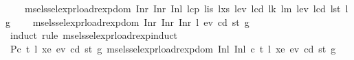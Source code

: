 \begin{isabellebody}
\ \ \ \ {\isachardoublequoteopen}msel{\isacharunderscore}{\kern0pt}ssel{\isacharunderscore}{\kern0pt}expr{\isacharunderscore}{\kern0pt}load{\isacharunderscore}{\kern0pt}rexp{\isacharunderscore}{\kern0pt}dom\ {\isacharparenleft}{\kern0pt}Inr\ {\isacharparenleft}{\kern0pt}Inr\ {\isacharparenleft}{\kern0pt}Inl\ {\isacharparenleft}{\kern0pt}lcp{\isacharcomma}{\kern0pt}\ lis{\isacharcomma}{\kern0pt}\ lxs{\isacharcomma}{\kern0pt}\ lev{}{\isacharcomma}{\kern0pt}\ lcd{}{\isacharcomma}{\kern0pt}\ lk{\isacharcomma}{\kern0pt}\ lm{\isacharcomma}{\kern0pt}\ lev{\isacharcomma}{\kern0pt}\ lcd{\isacharcomma}{\kern0pt}\ lst{\isacharcomma}{\kern0pt}\ lg{\isacharparenright}{\kern0pt}{\isacharparenright}{\kern0pt}{\isacharparenright}{\kern0pt}{\isacharparenright}{\kern0pt}{\isachardoublequoteclose}\isanewline
\ \ \ \ {\isachardoublequoteopen}msel{\isacharunderscore}{\kern0pt}ssel{\isacharunderscore}{\kern0pt}expr{\isacharunderscore}{\kern0pt}load{\isacharunderscore}{\kern0pt}rexp{\isacharunderscore}{\kern0pt}dom\ {\isacharparenleft}{\kern0pt}Inr\ {\isacharparenleft}{\kern0pt}Inr\ {\isacharparenleft}{\kern0pt}Inr\ {\isacharparenleft}{\kern0pt}l{}{\isacharcomma}{\kern0pt}\ ev{}{\isacharcomma}{\kern0pt}\ cd{}{\isacharcomma}{\kern0pt}\ st{}{\isacharcomma}{\kern0pt}\ g{}{\isacharparenright}{\kern0pt}{\isacharparenright}{\kern0pt}{\isacharparenright}{\kern0pt}{\isacharparenright}{\kern0pt}{\isachardoublequoteclose}\isanewline
%
\isadelimproof
%
\endisadelimproof
%
\isatagproof
{}\isamarkupfalse%
\ {\isacharparenleft}{\kern0pt}induct\ rule{\isacharcolon}{\kern0pt}\ msel{\isacharunderscore}{\kern0pt}ssel{\isacharunderscore}{\kern0pt}expr{\isacharunderscore}{\kern0pt}load{\isacharunderscore}{\kern0pt}rexp{\isachardot}{\kern0pt}induct\isanewline
{\isacharbrackleft}{\kern0pt}\ {\isacharquery}{\kern0pt}P{}{\isachardot}{\kern0pt}{}{\isacharequal}{\kern0pt}{\isachardoublequoteopen}{\isasymlambda}c{}\ t{}\ l{}\ xe{}\ ev{}\ cd{}\ st{}\ g{}{\isachardot}{\kern0pt}\ msel{\isacharunderscore}{\kern0pt}ssel{\isacharunderscore}{\kern0pt}expr{\isacharunderscore}{\kern0pt}load{\isacharunderscore}{\kern0pt}rexp{\isacharunderscore}{\kern0pt}dom\ {\isacharparenleft}{\kern0pt}Inl\ {\isacharparenleft}{\kern0pt}Inl\ {\isacharparenleft}{\kern0pt}c{}{\isacharcomma}{\kern0pt}\ t{}{\isacharcomma}{\kern0pt}\ l{}{\isacharcomma}{\kern0pt}\ xe{}{\isacharcomma}{\kern0pt}\ ev{}{\isacharcomma}{\kern0pt}\ cd{}{\isacharcomma}{\kern0pt}\ st{}{\isacharcomma}{\kern0pt}\ g{}{\isacharparenright}{\kern0pt}{\isacharparenright}{\kern0pt}{\isacharparenright}{\kern0pt}{\isachardoublequoteclose}\isanewline

\end{isabellebody}
